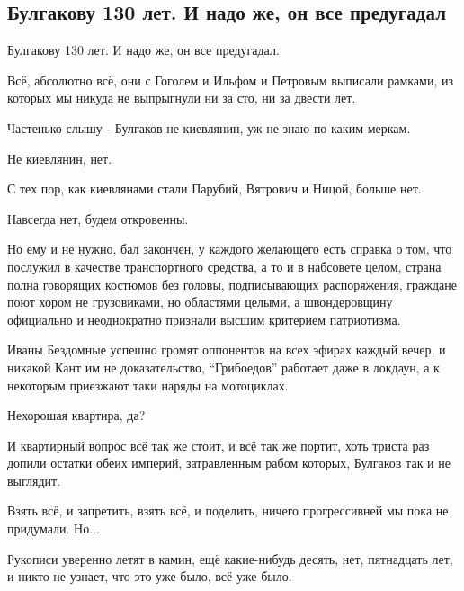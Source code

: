  
 
 
 
 
\subsection{Булгакову 130 лет.  И надо же, он все предугадал}

Булгакову 130 лет. И надо же, он все предугадал.

Всё, абсолютно всё, они с Гоголем и Ильфом и Петровым выписали рамками, из
которых мы никуда не выпрыгнули ни за сто, ни за двести лет.

Частенько слышу - Булгаков не киевлянин, уж не знаю по каким меркам.

Не киевлянин, нет.

С тех пор, как киевлянами стали Парубий, Вятрович и Ницой, больше нет.

Навсегда нет, будем откровенны.

Но ему и не нужно, бал закончен, у каждого желающего есть справка о том, что
послужил в качестве транспортного средства, а то и в набсовете целом, страна
полна говорящих костюмов без головы, подписывающих распоряжения, граждане поют
хором не грузовиками, но областями целыми, а швондеровщину официально и
неоднократно признали высшим критерием патриотизма.

Иваны Бездомные успешно громят оппонентов на всех эфирах каждый вечер, и
никакой Кант им не доказательство, \enquote{Грибоедов} работает даже в локдаун, а к
некоторым приезжают таки наряды на мотоциклах.

Нехорошая квартира, да?

И квартирный вопрос всё так же стоит, и всё так же портит, хоть триста раз
допили остатки обеих империй, затравленным рабом которых, Булгаков так и не
выглядит.

Взять всё, и запретить, взять всё, и поделить, ничего прогрессивней мы пока не
придумали.  Но...

Рукописи уверенно летят в камин, ещё какие-нибудь десять, нет, пятнадцать лет,
и никто не узнает, что это уже было, всё уже было.

